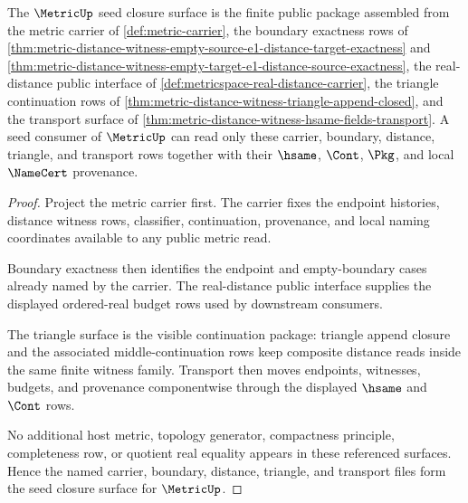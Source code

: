 \begin{theorem}
\label{thm:metric-seed-closure-surface}
The $\MetricUp$ seed closure surface is the finite public package assembled from the metric carrier of \autoref{def:metric-carrier}, the boundary exactness rows of \autoref{thm:metric-distance-witness-empty-source-e1-distance-target-exactness} and \autoref{thm:metric-distance-witness-empty-target-e1-distance-source-exactness}, the real-distance public interface of \autoref{def:metricspace-real-distance-carrier}, the triangle continuation rows of \autoref{thm:metric-distance-witness-triangle-append-closed}, and the transport surface of \autoref{thm:metric-distance-witness-hsame-fields-transport}. A seed consumer of $\MetricUp$ can read only these carrier, boundary, distance, triangle, and transport rows together with their $\hsame$, $\Cont$, $\Pkg$, and local $\NameCert$ provenance.
\end{theorem}
\begin{proof}
Project the metric carrier first. The carrier fixes the endpoint histories, distance witness rows, classifier, continuation, provenance, and local naming coordinates available to any public metric read.

Boundary exactness then identifies the endpoint and empty-boundary cases already named by the carrier. The real-distance public interface supplies the displayed ordered-real budget rows used by downstream consumers.

The triangle surface is the visible continuation package: triangle append closure and the associated middle-continuation rows keep composite distance reads inside the same finite witness family. Transport then moves endpoints, witnesses, budgets, and provenance componentwise through the displayed $\hsame$ and $\Cont$ rows.

No additional host metric, topology generator, compactness principle, completeness row, or quotient real equality appears in these referenced surfaces. Hence the named carrier, boundary, distance, triangle, and transport files form the seed closure surface for $\MetricUp$.
\end{proof}
